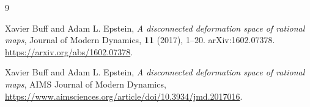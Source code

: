 \documentclass[12pt]{article}
\theoremstyle{definition}
\begin{document}
\begin{thebibliography}{9}

Xavier Buff and Adam L. Epstein,
\emph{A disconnected deformation space of rational maps},
Journal of Modern Dynamics, \textbf{11} (2017), 1--20.
arXiv:1602.07378.
\url{https://arxiv.org/abs/1602.07378}.

Xavier Buff and Adam L. Epstein,
\emph{A disconnected deformation space of rational maps},
AIMS Journal of Modern Dynamics,
\url{https://www.aimsciences.org/article/doi/10.3934/jmd.2017016}.

\end{thebibliography}
\end{document}
